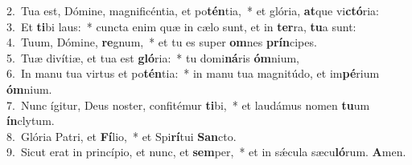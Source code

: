 {2.~}Tua est, Dómine, magnificéntia, et po\textbf{tén}tia,~* et glória, \textbf{at}que vi\textbf{ctó}ria:\\
{3.~}Et \textbf{ti}bi laus:~* cuncta enim quæ in cælo sunt, et in \textbf{ter}ra, \textbf{tu}a sunt:\\
{4.~}Tuum, Dómine, \textbf{re}gnum,~* et tu es super \textbf{om}nes \textbf{prín}cipes.\\
{5.~}Tuæ divítiæ, et tua est \textbf{gló}ria:~* tu domi\textbf{ná}ris \textbf{óm}nium,\\
{6.~}In manu tua virtus et po\textbf{tén}tia:~* in manu tua magnitúdo, et im\textbf{pé}rium \textbf{óm}nium.\\
{7.~}Nunc ígitur, Deus noster, confitémur \textbf{ti}bi,~* et laudámus nomen \textbf{tu}um \textbf{ín}clytum.\\
{8.~}Glória Patri, et \textbf{Fí}lio,~* et Spi\textbf{rí}tui \textbf{San}cto.\\
{9.~}Sicut erat in princípio, et nunc, et \textbf{sem}per,~* et in sǽcula sæcu\textbf{ló}rum. \textbf{A}men.\\
